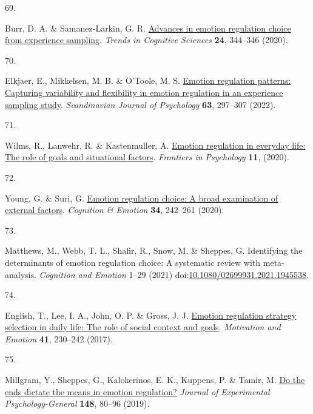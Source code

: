 \documentclass[
  man,floatsintext]{apa6}
\newlength{\cslhangindent}
\newlength{\csllabelwidth}
\newlength{\cslentryspacingunit} %
\newenvironment{CSLReferences}[2] %
 {%
  \setlength{\parindent}{0pt}
  \ifodd #1
  \let\oldpar\par
  \def\par{\hangindent=\cslhangindent\oldpar}
  \fi
  \setlength{\parskip}{#2\cslentryspacingunit}
 }%
 {}
\newcommand{\CSLLeftMargin}[1]{\parbox[t]{\csllabelwidth}{#1}}
\newcommand{\CSLRightInline}[1]{\parbox[t]{\linewidth - \csllabelwidth}{#1}\break}
\begin{document}
\begin{CSLReferences}{0}{0}
\leavevmode{}%
\CSLLeftMargin{69. }%
\CSLRightInline{Burr, D. A. \& Samanez-Larkin, G. R. \href{https://doi.org/10.1016/j.tics.2020.02.008}{Advances in emotion regulation choice from experience sampling}. \emph{Trends in Cognitive Sciences} \textbf{24}, 344--346 (2020).}

\leavevmode{}%
\CSLLeftMargin{70. }%
\CSLRightInline{Elkjaer, E., Mikkelsen, M. B. \& O'Toole, M. S. \href{https://doi.org/10.1111/sjop.12808}{Emotion regulation patterns: Capturing variability and flexibility in emotion regulation in an experience sampling study}. \emph{Scandinavian Journal of Psychology} \textbf{63}, 297--307 (2022).}

\leavevmode{}%
\CSLLeftMargin{71. }%
\CSLRightInline{Wilms, R., Lanwehr, R. \& Kastenmuller, A. \href{https://doi.org/ARTN\%20877\%0A10.3389/fpsyg.2020.00877}{Emotion regulation in everyday life: The role of goals and situational factors}. \emph{Frontiers in Psychology} \textbf{11}, (2020).}

\leavevmode{}%
\CSLLeftMargin{72. }%
\CSLRightInline{Young, G. \& Suri, G. \href{https://doi.org/10.1080/02699931.2019.1611544}{Emotion regulation choice: A broad examination of external factors}. \emph{Cognition \& Emotion} \textbf{34}, 242--261 (2020).}

\leavevmode{}%
\CSLLeftMargin{73. }%
\CSLRightInline{Matthews, M., Webb, T. L., Shafir, R., Snow, M. \& Sheppes, G. Identifying the determinants of emotion regulation choice: A systematic review with meta-analysis. \emph{Cognition and Emotion} 1--29 (2021) doi:\href{https://doi.org/10.1080/02699931.2021.1945538}{10.1080/02699931.2021.1945538}.}

\leavevmode{}%
\CSLLeftMargin{74. }%
\CSLRightInline{English, T., Lee, I. A., John, O. P. \& Gross, J. J. \href{https://doi.org/10.1007/s11031-016-9597-z}{Emotion regulation strategy selection in daily life: The role of social context and goals}. \emph{Motivation and Emotion} \textbf{41}, 230--242 (2017).}

\leavevmode{}%
\CSLLeftMargin{75. }%
\CSLRightInline{Millgram, Y., Sheppes, G., Kalokerinos, E. K., Kuppens, P. \& Tamir, M. \href{https://doi.org/10.1037/xge0000477}{Do the ends dictate the means in emotion regulation?} \emph{Journal of Experimental Psychology-General} \textbf{148}, 80--96 (2019).}


\end{CSLReferences}
\end{document}
